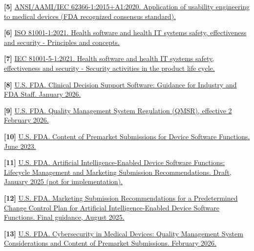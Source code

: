 \documentclass[11pt,letterpaper]{article}
\begin{document}
\textbf{[5] }\href{\detokenize{https://www.accessdata.fda.gov/scripts/cdrh/cfdocs/cfstandards/detail.cfm?standard__identification_no=41235}}{ANSI\slash\allowbreak{}AAMI\slash\allowbreak{}IEC 62366-1:2015+A1:2020. Application of usability engineering to medical devices (FDA recognized consensus standard).}

\textbf{[6] }\href{\detokenize{https://webstore.iec.ch/en/publication/34286}}{ISO 81001-1:2021. Health software and health IT systems safety, effectiveness and security - Principles and concepts.}

\textbf{[7] }\href{\detokenize{https://webstore.iec.ch/en/publication/44844}}{IEC 81001-5-1:2021. Health software and health IT systems safety, effectiveness and security - Security activities in the product life cycle.}

\textbf{[8] }\href{\detokenize{https://www.fda.gov/regulatory-information/search-fda-guidance-documents/clinical-decision-support-software}}{U.S. FDA. Clinical Decision Support Software: Guidance for Industry and FDA Staff. January 2026.}

\textbf{[9] }\href{\detokenize{https://www.fda.gov/medical-devices/postmarket-requirements-devices/quality-management-system-regulation-qmsr}}{U.S. FDA. Quality Management System Regulation (QMSR), effective 2 February 2026.}

\textbf{[10] }\href{\detokenize{https://www.fda.gov/regulatory-information/search-fda-guidance-documents/content-premarket-submissions-device-software-functions}}{U.S. FDA. Content of Premarket Submissions for Device Software Functions. June 2023.}

\textbf{[11] }\href{\detokenize{https://www.fda.gov/regulatory-information/search-fda-guidance-documents/artificial-intelligence-enabled-device-software-functions-lifecycle-management-and-marketing}}{U.S. FDA. Artificial Intelligence-Enabled Device Software Functions: Lifecycle Management and Marketing Submission Recommendations. Draft, January 2025 (not for implementation).}

\textbf{[12] }\href{\detokenize{https://www.fda.gov/medical-devices/software-medical-device-samd/predetermined-change-control-plans-machine-learning-enabled-medical-devices-guiding-principles}}{U.S. FDA. Marketing Submission Recommendations for a Predetermined Change Control Plan for Artificial Intelligence-Enabled Device Software Functions. Final guidance, August 2025.}

\textbf{[13] }\href{\detokenize{https://www.fda.gov/regulatory-information/search-fda-guidance-documents/cybersecurity-medical-devices-quality-management-system-considerations-and-content-premarket}}{U.S. FDA. Cybersecurity in Medical Devices: Quality Management System Considerations and Content of Premarket Submissions. February 2026.}
\end{document}

